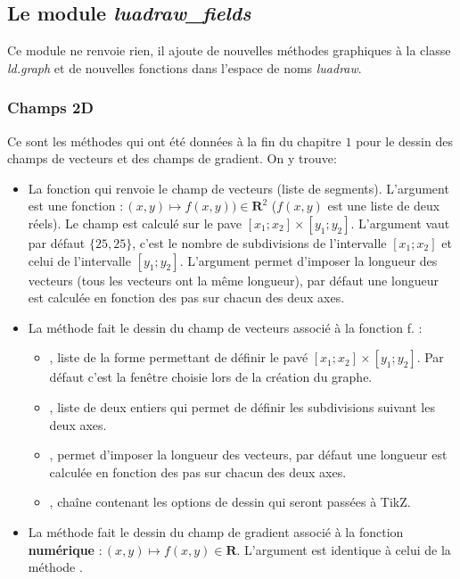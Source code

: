 \subsection{Le module \emph{luadraw\_fields}}


Ce module ne renvoie rien, il ajoute de nouvelles méthodes graphiques à la classe \emph{ld.graph} et de nouvelles fonctions dans l'espace de noms \emph{luadraw}. 


\subsubsection{Champs 2D}

Ce sont les méthodes qui ont été données à la fin du chapitre $1$ pour le dessin des champs de vecteurs et des champs de gradient. On y trouve:

\begin{itemize}
    \item La fonction  qui renvoie le champ de vecteurs (liste de segments). L'argument  est une fonction $\colon(x,y)\mapsto f(x,y))\in\mathbf R^2$ ($f(x,y)$ est une liste de deux réels). Le champ est calculé sur le pave $[x_1;x_2]\times[y_1;y_2]$. L'argument  vaut par défaut $\{25,25\}$, c'est le nombre de subdivisions de l'intervalle $[x_1;x_2]$ et celui de l'intervalle $[y_1;y_2]$. L'argument  permet d'imposer la longueur des vecteurs (tous les vecteurs ont la même longueur), par défaut une longueur est calculée en fonction des pas sur chacun des deux axes.
    
    \item La méthode  fait le dessin du champ de vecteurs associé à la fonction \argu f. \writeoptions :
        \begin{itemize}
            \item {}, liste de la forme  permettant de définir le pavé $[x_1;x_2]\times [y_1;y_2]$. Par défaut c'est la fenêtre choisie lors de la création du graphe.
            \item {}, liste de deux entiers qui permet de définir les subdivisions suivant les deux axes.
            \item {}, permet d'imposer la longueur des vecteurs, par défaut une longueur est calculée en fonction des pas sur chacun des deux axes.
            \item {}, chaîne contenant les options de dessin qui seront passées à TikZ.
        \end{itemize}
        
    \item La méthode  fait le dessin du champ de gradient associé à la fonction \textbf{numérique} $\colon(x,y)\mapsto f(x,y)\in \mathbf R$. L'argument  est identique à celui de la méthode .
\end{itemize}

